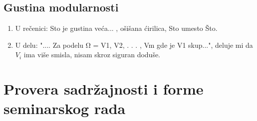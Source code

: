 \documentclass[a4paper]{report}
\begin{document}
\subsection{Gustina modularnosti}
\begin{enumerate}
  \item U  rečenici: Sto je gustina veća... , ošišana ćirilica, Sto umesto Što.
  \item U delu: ".... Za podelu Ω = {V1, V2, . . . , Vm} gde je V1 skup...", deluje mi da $V_i$ ima više smisla, nisam skroz siguran doduše.
\end{enumerate}



\section{Provera sadržajnosti i forme seminarskog rada}
\end{document}
